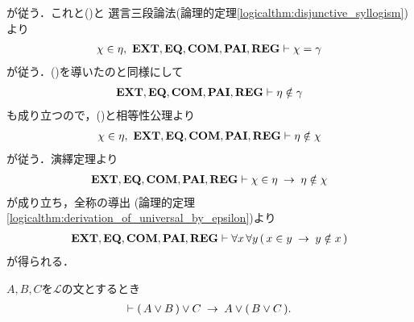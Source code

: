 \begin{sketch}
		が従う．これと()と
		選言三段論法(論理的定理\ref{logicalthm:disjunctive_syllogism})より
		\begin{align}
			\chi \in \eta,\ \mbox{{\bf EXT}},\mbox{{\bf EQ}},\mbox{\bf COM},\mbox{{\bf PAI}},\mbox{{\bf REG}} \vdash 
			\chi = \gamma
			\label{fom:no_pair_of_sets_go_round_9}
		\end{align}
		が従う．()を導いたのと同様にして
		\begin{align}
			\mbox{{\bf EXT}},\mbox{{\bf EQ}},\mbox{\bf COM},\mbox{{\bf PAI}},\mbox{{\bf REG}} \vdash \eta \notin \gamma
		\end{align}
		も成り立つので，()と相等性公理より
		\begin{align}
			\chi \in \eta,\ \mbox{{\bf EXT}},\mbox{{\bf EQ}},\mbox{\bf COM},\mbox{{\bf PAI}},\mbox{{\bf REG}} \vdash 
			\eta \notin \chi
		\end{align}
		が従う．演繹定理より
		\begin{align}
			\mbox{{\bf EXT}},\mbox{{\bf EQ}},\mbox{\bf COM},\mbox{{\bf PAI}},\mbox{{\bf REG}} \vdash 
			\chi \in \eta \hspace{0.25em}\rightarrow\hspace{0.25em} \eta \notin \chi
		\end{align}
		が成り立ち，全称の導出
		(論理的定理\ref{logicalthm:derivation_of_universal_by_epsilon})より
		\begin{align}
			\mbox{{\bf EXT}},\mbox{{\bf EQ}},\mbox{\bf COM},\mbox{{\bf PAI}},\mbox{{\bf REG}} \vdash 
			\forall x\, \forall y\, (\, x \in y \hspace{0.25em}\rightarrow\hspace{0.25em} y \notin x\, )
		\end{align}
		が得られる．
		\QED
	\end{sketch}
	
	\begin{screen}
		\begin{logicalthm}[論理和の結合律]
		\label{logicalthm:associative_law_of_conjunctions}
			$A,B,C$を$\mathcal{L}$の文とするとき
			\begin{align}
				\vdash (\, A \vee B\, ) \vee C \hspace{0.25em}\rightarrow\hspace{0.25em} A \vee (\, B \vee C\, ).
			\end{align}
		\end{logicalthm}
	\end{screen}
	
